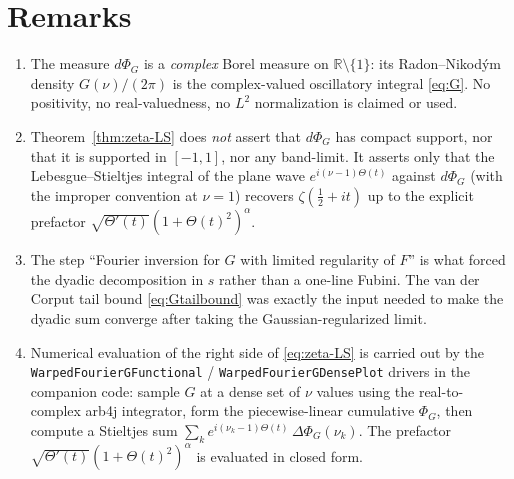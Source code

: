 \documentclass[11pt]{article}
\begin{document}
\section{Remarks}

\begin{enumerate}
\item[(i)] The measure $d\Phi_G$ is a \emph{complex} Borel measure on $\mathbb R\setminus\{1\}$: its Radon--Nikod\'ym density $G(\nu)/(2\pi)$ is the complex-valued oscillatory integral \eqref{eq:G}. No positivity, no real-valuedness, no $L^2$ normalization is claimed or used.

\item[(ii)] Theorem~\ref{thm:zeta-LS} does \emph{not} assert that $d\Phi_G$ has compact support, nor that it is supported in $[-1,1]$, nor any band-limit. It asserts only that the Lebesgue--Stieltjes integral of the plane wave $e^{i(\nu-1)\Theta(t)}$ against $d\Phi_G$ (with the improper convention at $\nu=1$) recovers $\zeta(\tfrac12+it)$ up to the explicit prefactor $\sqrt{\Theta'(t)}(1+\Theta(t)^2)^\alpha$.

\item[(iii)] The step ``Fourier inversion for $G$ with limited regularity of $F$'' is what forced the dyadic decomposition in $s$ rather than a one-line Fubini. The van der Corput tail bound \eqref{eq:Gtailbound} was exactly the input needed to make the dyadic sum converge after taking the Gaussian-regularized limit.

\item[(iv)] Numerical evaluation of the right side of \eqref{eq:zeta-LS} is carried out by the \texttt{WarpedFourierGFunctional} / \texttt{WarpedFourierGDensePlot} drivers in the companion code: sample $G$ at a dense set of $\nu$ values using the real-to-complex arb4j integrator, form the piecewise-linear cumulative $\Phi_G$, then compute a Stieltjes sum $\sum_k e^{i(\nu_k-1)\Theta(t)}\,\Delta\Phi_G(\nu_k)$. The prefactor $\sqrt{\Theta'(t)}(1+\Theta(t)^2)^\alpha$ is evaluated in closed form.
\end{enumerate}
\end{document}
